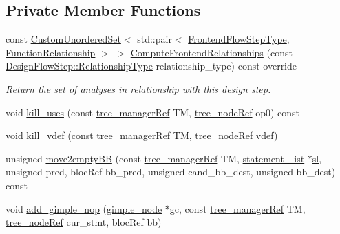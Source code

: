 \subsection*{Private Member Functions}
\begin{DoxyCompactItemize}
\item 
const \hyperlink{classCustomUnorderedSet}{Custom\+Unordered\+Set}$<$ std\+::pair$<$ \hyperlink{frontend__flow__step_8hpp_afeb3716c693d2b2e4ed3e6d04c3b63bb}{Frontend\+Flow\+Step\+Type}, \hyperlink{classFrontendFlowStep_af7cf30f2023e5b99e637dc2058289ab0}{Function\+Relationship} $>$ $>$ \hyperlink{classdead__code__elimination_a76cbac14d90ba6ac5229416d7d90667f}{Compute\+Frontend\+Relationships} (const \hyperlink{classDesignFlowStep_a723a3baf19ff2ceb77bc13e099d0b1b7}{Design\+Flow\+Step\+::\+Relationship\+Type} relationship\+\_\+type) const override
\begin{DoxyCompactList}\small\item\em Return the set of analyses in relationship with this design step. \end{DoxyCompactList}\item 
void \hyperlink{classdead__code__elimination_af489c33b5908e6b2a9cb967022ee37da}{kill\+\_\+uses} (const \hyperlink{tree__manager_8hpp_a96ff150c071ce11a9a7a1e40590f205e}{tree\+\_\+manager\+Ref} TM, \hyperlink{tree__node_8hpp_a6ee377554d1c4871ad66a337eaa67fd5}{tree\+\_\+node\+Ref} op0) const
\item 
void \hyperlink{classdead__code__elimination_acf7b0a14bfd3b75d84f97fbb303736df}{kill\+\_\+vdef} (const \hyperlink{tree__manager_8hpp_a96ff150c071ce11a9a7a1e40590f205e}{tree\+\_\+manager\+Ref} TM, \hyperlink{tree__node_8hpp_a6ee377554d1c4871ad66a337eaa67fd5}{tree\+\_\+node\+Ref} vdef)
\item 
unsigned \hyperlink{classdead__code__elimination_a195659a171fca995cfd7a6f59017c37d}{move2empty\+BB} (const \hyperlink{tree__manager_8hpp_a96ff150c071ce11a9a7a1e40590f205e}{tree\+\_\+manager\+Ref} TM, \hyperlink{structstatement__list}{statement\+\_\+list} $\ast$\hyperlink{tutorial__pnnl__2019_2optimizations_2second_2solution_2adpcm_8c_ace9c0991f7fffe6ab436175d7fff821e}{sl}, unsigned pred, bloc\+Ref bb\+\_\+pred, unsigned cand\+\_\+bb\+\_\+dest, unsigned bb\+\_\+dest) const
\item 
void \hyperlink{classdead__code__elimination_aa17a85671486094c9539adb9dc3a9739}{add\+\_\+gimple\+\_\+nop} (\hyperlink{structgimple__node}{gimple\+\_\+node} $\ast$gc, const \hyperlink{tree__manager_8hpp_a96ff150c071ce11a9a7a1e40590f205e}{tree\+\_\+manager\+Ref} TM, \hyperlink{tree__node_8hpp_a6ee377554d1c4871ad66a337eaa67fd5}{tree\+\_\+node\+Ref} cur\+\_\+stmt, bloc\+Ref bb)
\end{DoxyCompactItemize}

